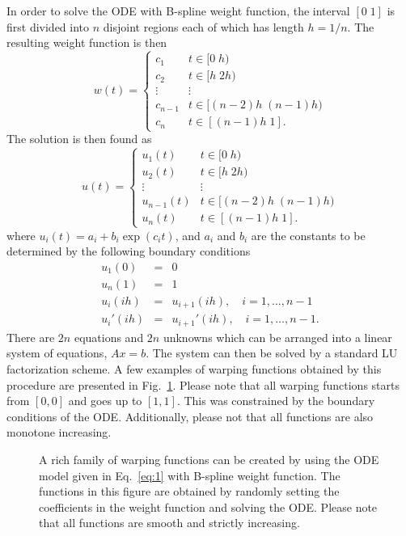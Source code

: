 \documentclass[number,1p,12pt]{elsarticle}
\begin{document}
In order to solve the ODE with B-spline weight function, the interval $[0\;1]$ is first divided into $n$ disjoint regions each of which has length $h=1/n$. The resulting weight function is then
\begin{equation}
w(t) = \left\{
\begin{array}{ll}
 c_1 & t\in [0\;h)\\
 c_2 & t\in [h\;2h)\\
 \vdots & \vdots \\
 c_{n-1} & t\in [(n-2)h\;(n-1)h)\\
 c_n & t\in [(n-1)h\;1].
\end{array}
\right. \label{eq:5} 
\end{equation}
The solution is then found as
\begin{equation}
u(t)  =  \left\{
\begin{array}{ll}
 u_1(t) & t\in [0\;h)\\
 u_2(t) & t\in [h\;2h)\\
 \vdots & \vdots \\
 u_{n-1}(t) & t\in [(n-2)h\;(n-1)h)\\
 u_n(t) & t\in [(n-1)h\;1].
\end{array}
\right.
\end{equation}
where $u_i(t) =  a_i + b_i\exp({c_it})$, and $a_i$ and $b_i$ are the constants to be determined by the following boundary conditions 
\begin{eqnarray}
 u_1(0)          & = & 0 \\
 u_n(1)          & = & 1 \\
 u_i(ih)  & = & u_{i+1}(ih),\quad i=1,\ldots,n-1 \\
 u_i'(ih)  & = & u_{i+1}'(ih),\quad i=1,\ldots,n-1 .
\end{eqnarray}
There are $2n$ equations and $2n$ unknowns which can be arranged into a linear system of equations, $Ax=b$. The system can then be solved by a standard LU factorization scheme. A few examples of warping functions obtained by this procedure are presented in Fig.~\ref{Figure02}. Please note that all warping functions starts from $[0,0]$ and goes up to $[1,1]$. This was constrained by the boundary conditions of the ODE. Additionally, please not that all functions are also monotone increasing. 

\begin{figure}
\caption{A rich family of warping functions can be created by using the ODE model given in Eq.~\ref{eq:1} with B-spline weight function. The functions in this figure are obtained by randomly setting the coefficients in the weight function and solving the ODE. Please note that all functions are smooth and strictly increasing.}
\label{Figure02}
\end{figure} 
\end{document}
